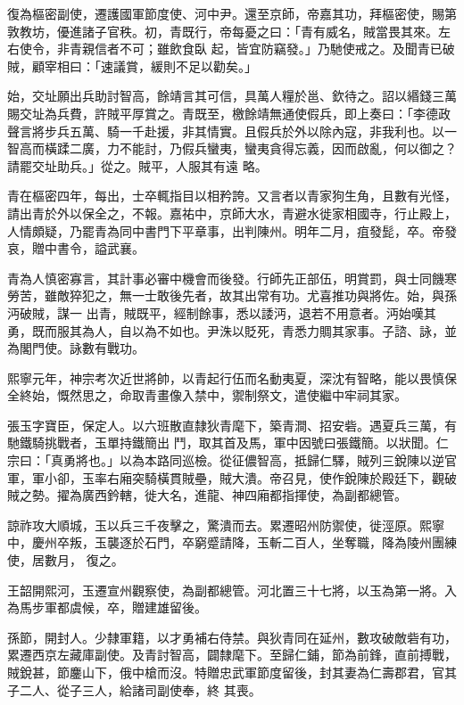 \begin{pinyinscope}
 復為樞密副使，遷護國軍節度使、河中尹。還至京師，帝嘉其功，拜樞密使，賜第敦教坊，優進諸子官秩。初，青既行，帝每憂之曰：「青有威名，賊當畏其來。左右使令，非青親信者不可；雖飲食臥
 起，皆宜防竊發。」乃馳使戒之。及聞青已破賊，顧宰相曰：「速議賞，緩則不足以勸矣。」



 始，交址願出兵助討智高，餘靖言其可信，具萬人糧於邕、欽待之。詔以緡錢三萬賜交址為兵費，許賊平厚賞之。青既至，檄餘靖無通使假兵，即上奏曰：「李德政聲言將步兵五萬、騎一千赴援，非其情實。且假兵於外以除內寇，非我利也。以一智高而橫蹂二廣，力不能討，乃假兵蠻夷，蠻夷貪得忘義，因而啟亂，何以御之？請罷交址助兵。」從之。賊平，人服其有遠
 略。



 青在樞密四年，每出，士卒輒指目以相矜誇。又言者以青家狗生角，且數有光怪，請出青於外以保全之，不報。嘉祐中，京師大水，青避水徙家相國寺，行止殿上，人情頗疑，乃罷青為同中書門下平章事，出判陳州。明年二月，疽發髭，卒。帝發哀，贈中書令，謚武襄。



 青為人慎密寡言，其計事必審中機會而後發。行師先正部伍，明賞罰，與士同饑寒勞苦，雖敵猝犯之，無一士敢後先者，故其出常有功。尤喜推功與將佐。始，與孫沔破賊，謀一
 出青，賊既平，經制餘事，悉以諉沔，退若不用意者。沔始嘆其勇，既而服其為人，自以為不如也。尹洙以貶死，青悉力賙其家事。子諮、詠，並為閣門使。詠數有戰功。



 熙寧元年，神宗考次近世將帥，以青起行伍而名動夷夏，深沈有智略，能以畏慎保全終始，慨然思之，命取青畫像入禁中，禦制祭文，遣使繼中牢祠其家。



 張玉字寶臣，保定人。以六班散直隸狄青麾下，築青澗、招安砦。遇夏兵三萬，有馳鐵騎挑戰者，玉單持鐵簡出
 鬥，取其首及馬，軍中因號曰張鐵簡。以狀聞。仁宗曰：「真勇將也。」以為本路同巡檢。從征儂智高，抵歸仁驛，賊列三銳陳以逆官軍，軍小卻，玉率右廂突騎橫貫賊壘，賊大潰。帝召見，使作銳陳於殿廷下，觀破賊之勢。擢為廣西鈐轄，徙大名，進龍、神四廂都指揮使，為副都總管。



 諒祚攻大順城，玉以兵三千夜擊之，驚潰而去。累遷昭州防禦使，徙涇原。熙寧中，慶州卒叛，玉襲逐於石門，卒窮蹙請降，玉斬二百人，坐奪職，降為陵州團練使，居數月，
 復之。



 王韶開熙河，玉遷宣州觀察使，為副都總管。河北置三十七將，以玉為第一將。入為馬步軍都虞候，卒，贈建雄留後。



 孫節，開封人。少隸軍籍，以才勇補右侍禁。與狄青同在延州，數攻破敵砦有功，累遷西京左藏庫副使。及青討智高，闢隸麾下。至歸仁鋪，節為前鋒，直前搏戰，賊銳甚，節鏖山下，俄中槍而沒。特贈忠武軍節度留後，封其妻為仁壽郡君，官其子二人、從子三人，給諸司副使奉，終
 其喪。




\end{pinyinscope}

